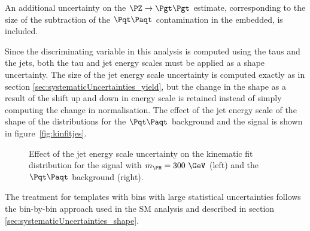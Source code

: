 An additional uncertainty on the $\ZToTauTau$ estimate, corresponding to the
size of the subtraction of the $\ttbar$ contamination in the embedded, is
included. 

Since the discriminating variable in this analysis is computed using the taus
and the jets, both the tau and jet energy scales must be applied as a shape
uncertainty. The size of the jet energy scale uncertainty is computed exactly as
in section \ref{sec:systematicUncertainties_yield}, but the change in the shape
as a result of the shift up and down in energy scale is retained instead of
simply computing the change in normalisation. The effect of the jet energy scale
of the shape of the distributions for the $\ttbar$ background and the signal is
shown in figure~\ref{fig:kinfitjes}.

\begin{figure}
\begin{center}

\end{center}
\caption{
Effect of the jet energy scale uncertainty on the kinematic fit distribution for
the signal with $m_{\PH}=300~\GeV$ (left) and the $\ttbar$ background (right).}
\label{fig:kinfitjet}
\end{figure} 

The treatment for templates with bins with large statistical uncertainties
follows the bin-by-bin approach used in the \ac{SM} analysis and described in
section \ref{sec:systematicUncertainties_shape}.

